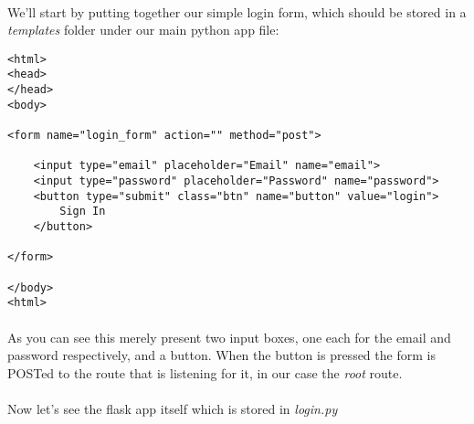 \documentclass[12pt, a4paper, twoside]{book}
\begin{document}
\paragraph{} We'll start by putting together our simple login form, which should be stored in a \emph{templates} folder under our main python app file:

\begin{lstlisting}
<html>
<head>
</head>
<body>

<form name="login_form" action="" method="post">

    <input type="email" placeholder="Email" name="email">
    <input type="password" placeholder="Password" name="password">
    <button type="submit" class="btn" name="button" value="login">
        Sign In
    </button>

</form>

</body>
<html>
\end{lstlisting}

\paragraph{} As you can see this merely present two input boxes, one each for the email and password respectively, and a button. When the button is pressed the form is POSTed to the route that is listening for it, in our case the \emph{root} route.

\paragraph{} Now let's see the flask app itself which is stored in \emph{login.py}
\end{document}
